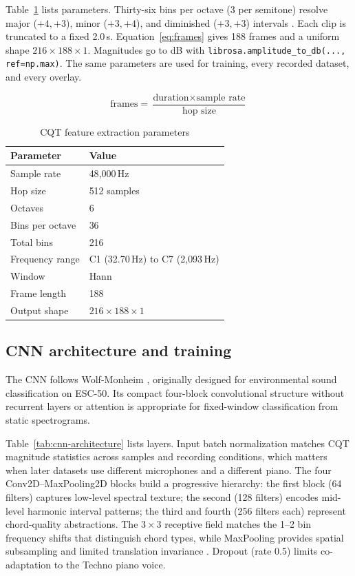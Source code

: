\documentclass[pdflatex,sn-mathphys-num,iicol]{sn-jnl}
\theoremstyle{thmstyleone}
\theoremstyle{thmstyletwo}
\theoremstyle{thmstylethree}
\begin{document}
Table~\ref{tab:cqt-extraction-params} lists parameters. Thirty-six bins per octave (3 per semitone) resolve major ($+4,+3$), minor ($+3,+4$), and diminished ($+3,+3$) intervals \cite{Akram2025}\cite{OHanlon2021}. Each clip is truncated to a fixed 2.0\,s. Equation~\ref{eq:frames} gives 188 frames and a uniform shape $216 \times 188 \times 1$. Magnitudes go to dB with \texttt{librosa.amplitude\_to\_db(..., ref=np.max)}. The same parameters are used for training, every recorded dataset, and every overlay.

\begin{equation}
\text{frames} = \frac{\text{duration} \times \text{sample rate}}{\text{hop size}}
\label{eq:frames}
\end{equation}

\begin{table}[t]
\caption{CQT feature extraction parameters}\label{tab:cqt-extraction-params}
\begin{tabular}{@{}ll@{}}
\toprule
Parameter & Value \\
\midrule
Sample rate & 48{,}000\,Hz \\
Hop size & 512 samples \\
Octaves & 6 \\
Bins per octave & 36 \\
Total bins & 216 \\
Frequency range & C1 (32.70\,Hz) to C7 (2{,}093\,Hz) \\
Window & Hann \\
Frame length & 188 \\
Output shape & $216 \times 188 \times 1$ \\
\bottomrule
\end{tabular}
\end{table}

\subsection{CNN architecture and training}\label{subsec3_3}

The CNN follows Wolf-Monheim \cite{Wolf-Monheim2025}, originally designed for environmental sound classification on ESC-50. Its compact four-block convolutional structure without recurrent layers or attention is appropriate for fixed-window classification from static spectrograms.

Table~\ref{tab:cnn-architecture} lists layers. Input batch normalization matches CQT magnitude statistics across samples and recording conditions, which matters when later datasets use different microphones and a different piano. The four Conv2D--MaxPooling2D blocks build a progressive hierarchy: the first block (64 filters) captures low-level spectral texture; the second (128 filters) encodes mid-level harmonic interval patterns; the third and fourth (256 filters each) represent chord-quality abstractions. The $3\times3$ receptive field matches the 1--2 bin frequency shifts that distinguish chord types, while MaxPooling provides spatial subsampling and limited translation invariance \cite{Purwono2022}. Dropout (rate 0.5) limits co-adaptation to the Techno piano voice.
\end{document}
